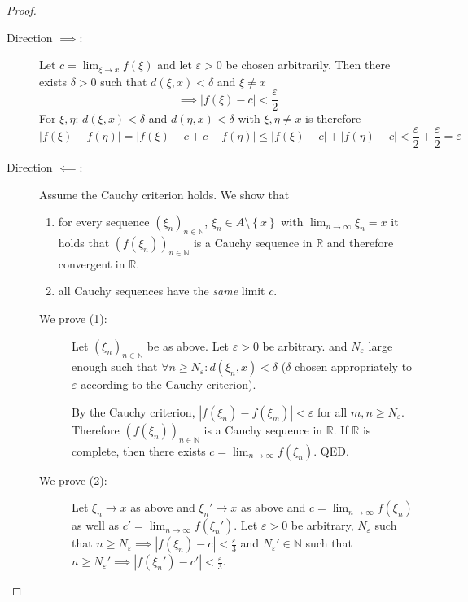 \documentclass{article}
\newcommand{\set}[1]{\left\{#1\right\}}
\newcommand{\card}[1]{\left|#1\right|}
\begin{document}
\begin{proof}
  \begin{description}
    \item[Direction $\implies$:]
      Let $c = \lim_{\xi\to x} f(\xi)$ and let $\varepsilon > 0$ be chosen arbitrarily.
      Then there exists $\delta > 0$ such that $d(\xi,x) < \delta$ and $\xi \neq x$
      \[ \implies \card{f(\xi) - c} < \frac\varepsilon2 \]
      For $\xi, \eta$: $d(\xi, x) < \delta$ and $d(\eta, x) < \delta$ with $\xi, \eta \neq x$
      is therefore
      \[ \card{f(\xi) - f(\eta)} = \card{f(\xi) - c + c - f(\eta)} \leq \card{f(\xi) - c} + \card{f(\eta) - c} < \frac\varepsilon2 + \frac\varepsilon2 = \varepsilon \]
    \item[Direction $\impliedby$:]
      Assume the Cauchy criterion holds. We show that
      \begin{enumerate}
        \item for every sequence $(\xi_n)_{n\in\mathbb N}$, $\xi_n \in A \setminus \set{x}$ with $\lim_{n\to\infty} \xi_n = x$ it holds that
        $(f(\xi_n))_{n\in\mathbb N}$ is a Cauchy sequence in $\mathbb R$ and therefore convergent in $\mathbb R$.
        \item all Cauchy sequences have the \emph{same} limit $c$.
      \end{enumerate}

      \begin{description}
        \item[We prove (1):]

        Let $(\xi_n)_{n\in\mathbb N}$ be as above. Let $\varepsilon > 0$ be arbitrary.
        and $N_{\varepsilon}$ large enough such that $\forall n \geq N_{\varepsilon}: d(\xi_n, x) < \delta$
        ($\delta$ chosen appropriately to $\varepsilon$ according to the Cauchy criterion).

        By the Cauchy criterion, $\card{f(\xi_n) - f(\xi_m)} < \varepsilon$ for all $m,n \geq N_{\varepsilon}$.
        Therefore $(f(\xi_n))_{n\in\mathbb N}$ is a Cauchy sequence in $\mathbb R$.
        If $\mathbb R$ is complete, then there exists $c = \lim_{n\to\infty} f(\xi_n)$. QED.

        \item[We prove (2):]
        Let $\xi_n \to x$ as above and $\xi_n' \to x$ as above and $c = \lim_{n\to\infty} f(\xi_n)$ as well as $c' = \lim_{n\to\infty} f(\xi_n')$. Let $\varepsilon > 0$ be arbitrary, $N_{\varepsilon}$ such that $n \geq N_{\varepsilon} \implies \card{f(\xi_n) - c} < \frac{\varepsilon}{3}$ and $N_{\varepsilon}' \in \mathbb N$ such that $n \geq N_{\varepsilon}' \implies \card{f(\xi_n') - c'} < \frac\varepsilon3$.


\end{description}
\end{description}
\end{proof}
\end{document}

